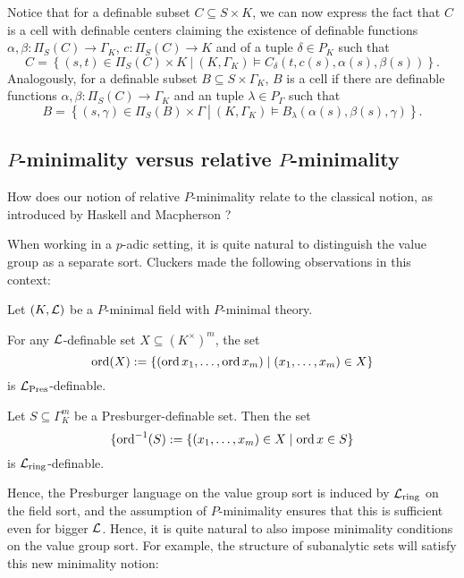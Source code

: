 Notice that for a definable subset $C\subseteq S\times K$, we can now express the fact that $C$ is a cell with definable centers claiming the existence of definable functions $\alpha,\beta:\Pi_S(C)\to\Gamma_K$, $c:\Pi_S(C)\to K$ and of a tuple $\delta\in P_K$ such that 
\[C = \left\{(s,t) \in \Pi_S(C)\times K \ \left| \ (K,\Gamma_K)\models C_\delta(t,c(s),\alpha(s),\beta(s))\right\}\right..
\]
Analogously, for a definable subset $B\subseteq S\times \Gamma_K$, $B$ is a cell if there are definable functions $\alpha,\beta:\Pi_S(C)\to\Gamma_K$ and an tuple $\lambda\in P_\Gamma$ such that  
\[B = \left\{(s,\gamma) \in \Pi_S(B) \times \Gamma \ \left| \ (K,\Gamma_K)\models B_\lambda(\alpha(s),\beta(s),\gamma)\right\}\right..
\]

\subsection{$P$-minimality versus relative $P$-minimality}
How does our notion of relative $P$-minimality relate to the classical notion, as introduced by Haskell and Macpherson \cite{has-mac-97}?

When working in a $p$-adic setting, it is quite natural to distinguish the value group as a separate sort. Cluckers \cite{clu-presb03} made the following observations in this context:
\begin{thm}\label{thm:semialgpres}
Let $(K, \mathcal{L})$ be a $P$-minimal field with $P$-minimal theory. 
\item For any $\mathcal{L}$-definable set $X \subseteq (K^{\times})^m$, the set
\[\operatorname{ord}(X):=\{(\operatorname{ord} x_1, \ldots, \operatorname{ord} x_m) \mid (x_1, \ldots, x_m) \in X\}\]
is $\mathcal{L}_{\text{Pres}}$-definable.
\item Let $S \subseteq \Gamma_K^m$ be a Presburger-definable set. Then the set
\[\{\operatorname{ord}^{-1}(S):= \{ (x_1, \ldots, x_m) \in X \mid \operatorname{ord} x \in S\}\]
is $\mathcal{L}_{\text{ring}}$-definable.
\end{thm} 
Hence, the Presburger language on the value group sort is induced by $\mathcal{L}_{\text{ring}}$ on the field sort, and the assumption of $P$-minimality ensures that this is sufficient even for bigger $\mathcal{L}$. Hence, it is quite natural to also impose minimality conditions on the value group sort. For example, the structure of subanalytic sets will satisfy this new minimality notion:

